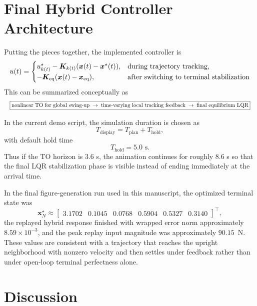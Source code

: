 \documentclass[conference]{IEEEtran}
\begin{document}
\section{Final Hybrid Controller Architecture}
Putting the pieces together, the implemented controller is
\begin{equation}
\resizebox{\columnwidth}{!}{$
u(t)=
\begin{cases}
u^{\star}_{k(t)}-\bm{K}_{k(t)}(\bm{x}(t)-\bm{x}^{\star}(t)),
& \text{during trajectory tracking}, \\
-\bm{K}_{\mathrm{eq}}(\bm{x}(t)-\bm{x}_{\mathrm{eq}}),
& \text{after switching to terminal stabilization}
\end{cases}
$}
\end{equation}
This can be summarized conceptually as
\begin{equation}
\resizebox{\columnwidth}{!}{$
\boxed{
\text{nonlinear TO for global swing-up}
\;\rightarrow\;
\text{time-varying local tracking feedback}
\;\rightarrow\;
\text{final equilibrium LQR}
}
$}
\end{equation}

In the current demo script, the simulation duration is chosen as
\begin{equation}
T_{\mathrm{display}} = T_{\mathrm{plan}} + T_{\mathrm{hold}},
\end{equation}
with default hold time
\begin{equation}
T_{\mathrm{hold}}=5.0 \text{ s}.
\end{equation}
Thus if the TO horizon is $3.6$ s, the animation continues for roughly $8.6$ s so that the final LQR stabilization phase is visible instead of ending immediately at the arrival time.

In the final figure-generation run used in this manuscript, the optimized terminal state was
\begin{equation}
\bm{x}_N^{\star} \approx
\begin{bmatrix}
3.1702 & 0.1045 & 0.0768 & 0.5904 & 0.5327 & 0.3140
\end{bmatrix}^{\top},
\end{equation}
the replayed hybrid response finished with wrapped error norm approximately $8.59\times 10^{-3}$, and the peak replay input magnitude was approximately $90.15$~N. These values are consistent with a trajectory that reaches the upright neighborhood with nonzero velocity and then settles under feedback rather than under open-loop terminal perfectness alone.

\section{Discussion}
\end{document}
